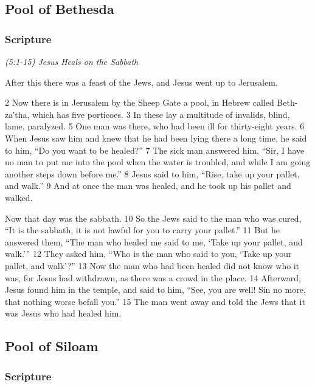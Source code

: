 \documentclass[letterpaper]{report}
\begin{document}
\clearpage
\subsection{Pool of Bethesda}
\begin{multicols}{2}
	\mbox{}
\end{multicols}
\subsubsection{Scripture}

{\centering
	\emph{(5:1-15) Jesus Heals on the Sabbath}\\
}
\begin{multicols}{2}
After this there was a feast of the Jews, and Jesus went up to Jerusalem.

2 Now there is in Jerusalem by the Sheep Gate a pool, in Hebrew called Beth-za′tha, which has five porticoes. 3 In these lay a multitude of invalids, blind, lame, paralyzed. 5 One man was there, who had been ill for thirty-eight years. 6 When Jesus saw him and knew that he had been lying there a long time, he said to him, “Do you want to be healed?” 7 The sick man answered him, “Sir, I have no man to put me into the pool when the water is troubled, and while I am going another steps down before me.” 8 Jesus said to him, “Rise, take up your pallet, and walk.” 9 And at once the man was healed, and he took up his pallet and walked.

Now that day was the sabbath. 10 So the Jews said to the man who was cured, “It is the sabbath, it is not lawful for you to carry your pallet.” 11 But he answered them, “The man who healed me said to me, ‘Take up your pallet, and walk.’” 12 They asked him, “Who is the man who said to you, ‘Take up your pallet, and walk’?” 13 Now the man who had been healed did not know who it was, for Jesus had withdrawn, as there was a crowd in the place. 14 Afterward, Jesus found him in the temple, and said to him, “See, you are well! Sin no more, that nothing worse befall you.” 15 The man went away and told the Jews that it was Jesus who had healed him.
\end{multicols}

\clearpage
\subsection{Pool of Siloam}
\begin{multicols}{2}
	\mbox{}
\end{multicols}
\subsubsection{Scripture}
\end{document}
